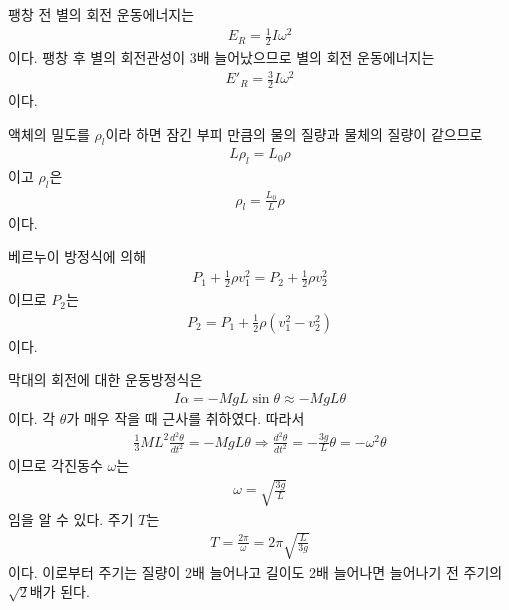 \documentclass[floatfix,nofootinbib,superscriptaddress,fleqn]{revtex4-2}
\begin{document}
\vspace{0.5cm} 

팽창 전 별의 회전 운동에너지는
\begin{align}
  E_R = \frac{1}{2}I\omega^2
\end{align}
이다. 팽창 후 별의 회전관성이 3배 늘어났으므로 별의 회전 운동에너지는
\begin{align}
  E'_R=\frac{3}{2}I\omega^2
\end{align}
이다.
\vspace{0.5cm}
 

\vspace{0.5cm} 
액체의 밀도를 $\rho_l$이라 하면 잠긴 부피 만큼의 물의 질량과
물체의 질량이 같으므로
\begin{align}
  L \rho_l = L_0 \rho
\end{align}
이고 $\rho_l$은
\begin{align}
  \rho_l = \frac{L_0}{L}\rho
\end{align}
이다.
\vspace{0.5cm}
 

\vspace{0.5cm} 
베르누이 방정식에 의해
\begin{align}
  P_1 + \frac{1}{2}\rho v_1^2
  =  P_2 + \frac{1}{2}\rho v_2^2
\end{align}
이므로 $P_2$는
\begin{align}
  P_2 = P_1 + \frac{1}{2}\rho\left(v_1^2-v_2^2\right)
\end{align}
이다.
\vspace{0.5cm}
 

\vspace{0.5cm} 
막대의 회전에 대한 운동방정식은
\begin{align}
  I\alpha = -MgL\sin\theta \approx -MgL\theta
\end{align}
이다. 각 $\theta$가 매우 작을 때 근사를 취하였다. 따라서
\begin{align}
  \frac{1}{3}ML^2 \frac{d^2\theta}{dt^2} = -MgL\theta \Longrightarrow
  \frac{d^2\theta}{dt^2} = -\frac{3g}{L}\theta = -\omega^2\theta
\end{align}
이므로 각진동수 $\omega$는
\begin{align}
  \omega = \sqrt{\frac{3g}{L}}
\end{align}
임을 알 수 있다. 주기 $T$는
\begin{align}
  T = \frac{2\pi}{\omega} =2\pi\sqrt{\frac{L}{3g}}
\end{align}
이다. 이로부터 주기는 질량이 2배 늘어나고 길이도 2배 늘어나면 늘어나기 전 주기의
$\sqrt{2}$배가 된다.
\vspace{0.5cm}
 
\end{document}
